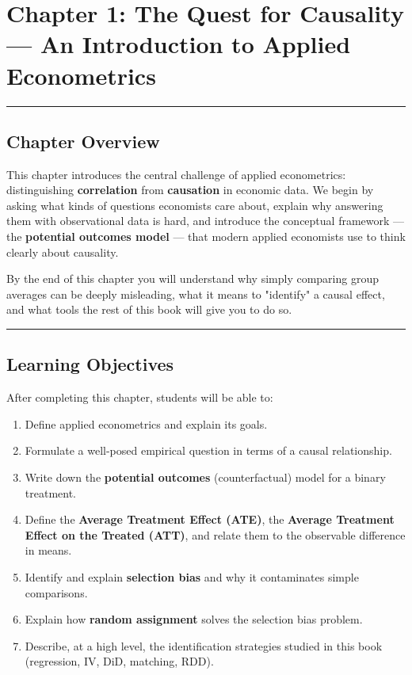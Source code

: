 \chapter{Chapter 1: The Quest for Causality --- An Introduction to Applied Econometrics}

\medskip\hrule\medskip

\section{Chapter Overview}

This chapter introduces the central challenge of applied econometrics: distinguishing \textbf{correlation} from \textbf{causation} in economic data. We begin by asking what kinds of questions economists care about, explain why answering them with observational data is hard, and introduce the conceptual framework --- the \textbf{potential outcomes model} --- that modern applied economists use to think clearly about causality.

By the end of this chapter you will understand why simply comparing group averages can be deeply misleading, what it means to "identify" a causal effect, and what tools the rest of this book will give you to do so.

\medskip\hrule\medskip

\section{Learning Objectives}

After completing this chapter, students will be able to:

\begin{enumerate}
\item Define applied econometrics and explain its goals.
\item Formulate a well-posed empirical question in terms of a causal relationship.
\item Write down the \textbf{potential outcomes} (counterfactual) model for a binary treatment.
\item Define the \textbf{Average Treatment Effect (ATE)}, the \textbf{Average Treatment Effect on the Treated (ATT)}, and relate them to the observable difference in means.
\item Identify and explain \textbf{selection bias} and why it contaminates simple comparisons.
\item Explain how \textbf{random assignment} solves the selection bias problem.
\item Describe, at a high level, the identification strategies studied in this book (regression, IV, DiD, matching, RDD).
\end{enumerate}

